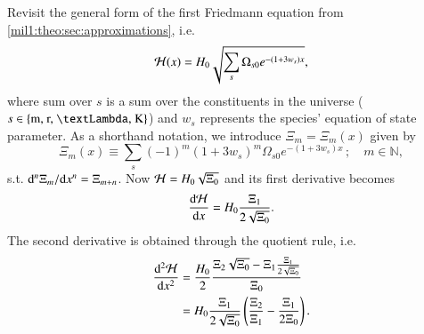 




Revisit the general form of the first Friedmann equation from \cref{mil1:theo:sec:approximations}, i.e.
\begin{equation}\label{app:hubble_derivatives:eq:Hp_of_x}
    \mathcal{H}(x) = H_0 \sqrt{\sum_{s}\Omega_{s0}e^{-(1+3w_s)x}},
\end{equation}
where sum over $s$ is a sum over the constituents in the universe ($s\in\left\{\text{m, r, \textLambda, K} \right\}$) and $w_s$ represents the species' equation of state parameter. As a shorthand notation, we introduce $\Xi_m = \Xi_m(x)$ given by
\begin{equation}\label{app:hubble_derivatives:eq:Xi_of_x}
    \Xi_{m}(x)\equiv \sum_{s} (-1)^m(1+3w_s)^m \Omega_{s0}e^{-(1+3w_s)x} \,; \quad m\in\mathbb{N},
\end{equation}\label{app:hubble_derivatives:dHp_dx}
s.t. $\mathrm{d}^n \Xi_m/\mathrm{d} x^n = \Xi_{m+n}$. Now $\mathcal{H} = H_0\sqrt{\Xi_0}$ and its first derivative becomes
\begin{equation}
    \frac{\mathrm{d} \mathcal{H}}{\mathrm{d} x} = H_0 \frac{\Xi_1}{2\sqrt{\Xi_0}}.
\end{equation}
The second derivative is obtained through the quotient rule, i.e.
\begin{equation}\label{app:hubble_derivatives:eq:ddHp_dxx}
    \begin{split}
    \frac{\mathrm{d}^2 \mathcal{H}}{\mathrm{d} x^2} &= \frac{H_0}{2} \frac{\Xi_2\sqrt{\Xi_0} - \Xi_1\frac{\Xi_1}{2\sqrt{\Xi_0}}}{\Xi_0} \\
    &= H_0\frac{\Xi_1} {2\sqrt{\Xi_0}}\left(  \frac{\Xi_2}{\Xi_1}- \frac{\Xi_1}{2\Xi_0} \right).
    \end{split}
\end{equation}



